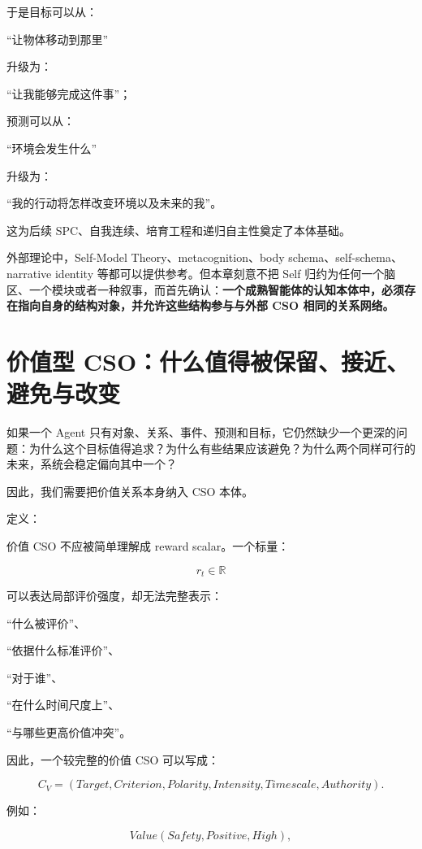于是目标可以从：

“让物体移动到那里”

升级为：

“让我能够完成这件事”；

预测可以从：

“环境会发生什么”

升级为：

“我的行动将怎样改变环境以及未来的我”。

这为后续 SPC、自我连续、培育工程和递归自主性奠定了本体基础。

外部理论中，Self-Model Theory、metacognition、body schema、self-schema、narrative identity 等都可以提供参考。但本章刻意不把 Self 归约为任何一个脑区、一个模块或者一种叙事，而首先确认：\textbf{一个成熟智能体的认知本体中，必须存在指向自身的结构对象，并允许这些结构参与与外部 CSO 相同的关系网络。}


\section{价值型 CSO：什么值得被保留、接近、避免与改变}

如果一个 Agent 只有对象、关系、事件、预测和目标，它仍然缺少一个更深的问题：为什么这个目标值得追求？为什么有些结果应该避免？为什么两个同样可行的未来，系统会稳定偏向其中一个？

因此，我们需要把价值关系本身纳入 CSO 本体。

定义：

\begin{statementbox}
\centering
{}
\end{statementbox}

价值 CSO 不应被简单理解成 reward scalar。一个标量：

\[
r_t\in\mathbb R
\]

可以表达局部评价强度，却无法完整表示：

“什么被评价”、

“依据什么标准评价”、

“对于谁”、

“在什么时间尺度上”、

“与哪些更高价值冲突”。

因此，一个较完整的价值 CSO 可以写成：

\[
C_V
=
(
Target,
Criterion,
Polarity,
Intensity,
Timescale,
Authority
).
\]

例如：

\[
Value(
Safety,
Positive,
High
),
\]

